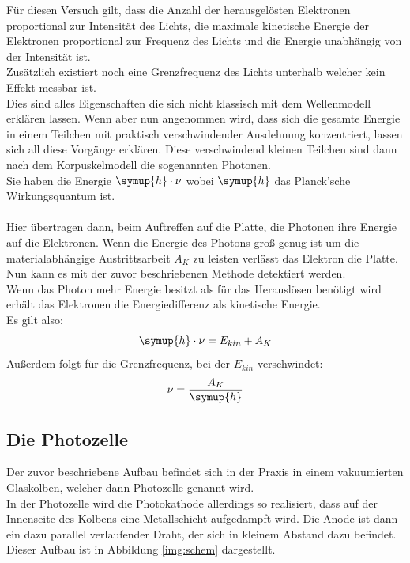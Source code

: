     \newpage
    \noindent Für diesen Versuch gilt, dass die Anzahl der herausgelösten Elektronen proportional zur Intensität des Lichts, 
    die maximale kinetische Energie der Elektronen proportional zur Frequenz des Lichts und die Energie unabhängig von der Intensität ist.\\
    Zusätzlich existiert noch eine Grenzfrequenz des Lichts unterhalb welcher kein Effekt messbar ist.\\
    Dies sind alles Eigenschaften die sich nicht klassisch mit dem Wellenmodell erklären lassen. Wenn aber nun angenommen wird, 
    dass sich die gesamte Energie in einem Teilchen mit praktisch verschwindender Ausdehnung konzentriert, lassen sich all diese Vorgänge erklären.
    Diese verschwindend kleinen Teilchen sind dann nach dem Korpuskelmodell die sogenannten Photonen.\\
    Sie haben die Energie $\symup{h}\cdot \nu$ wobei $\symup{h}$ das Planck'sche Wirkungsquantum\cite{Planck} ist.\\\\
    \noindent Hier übertragen dann, beim Auftreffen auf die Platte, die Photonen ihre Energie auf die Elektronen.
    Wenn die Energie des Photons groß genug ist um die materialabhängige Austrittsarbeit $A_K$ zu leisten verlässt das Elektron die Platte.
    Nun kann es mit der zuvor beschriebenen Methode detektiert werden.\\
    Wenn das Photon mehr Energie besitzt als für das Herauslösen benötigt wird erhält das Elektronen die Energiedifferenz als kinetische Energie.\\
    Es gilt also:
    \begin{equation*}
        \symup{h} \cdot \nu = E_{kin} + A_K
    \end{equation*}
    Außerdem folgt für die Grenzfrequenz, bei der $E_{kin}$ verschwindet:
    \begin{equation*}
        \nu=\frac{A_K}{\symup{h}}
    \end{equation*}
        
    \subsection{Die Photozelle}

    \noindent Der zuvor beschriebene Aufbau befindet sich in der Praxis in einem vakuumierten Glaskolben, welcher dann Photozelle genannt wird.\\
    In der Photozelle wird die Photokathode allerdings so realisiert, dass auf der Innenseite des Kolbens eine Metallschicht aufgedampft wird.
    Die Anode ist dann ein dazu parallel verlaufender Draht, der sich in kleinem Abstand dazu befindet.\\
    Dieser Aufbau ist in Abbildung \ref{img:schem} dargestellt.
    

